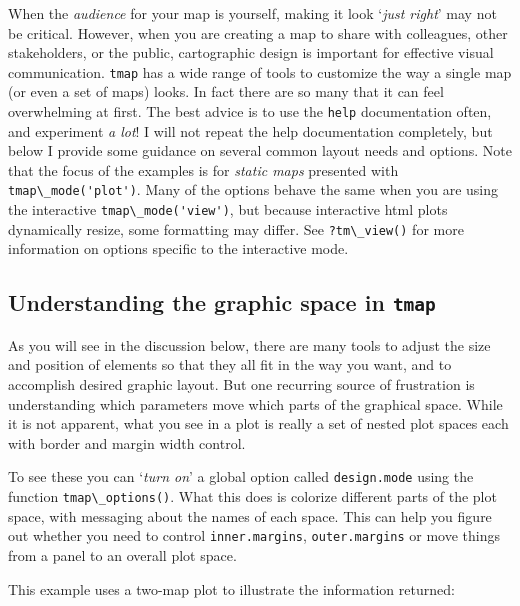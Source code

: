 \documentclass[
]{book}
\newcommand{\passthrough}[1]{#1}
\begin{document}
When the \emph{audience} for your map is yourself, making it look `\emph{just right}' may not be critical. However, when you are creating a map to share with colleagues, other stakeholders, or the public, cartographic design is important for effective visual communication. \passthrough{\lstinline!tmap!} has a wide range of tools to customize the way a single map (or even a set of maps) looks. In fact there are so many that it can feel overwhelming at first. The best advice is to use the \passthrough{\lstinline!help!} documentation often, and experiment \emph{a lot}! I will not repeat the help documentation completely, but below I provide some guidance on several common layout needs and options. Note that the focus of the examples is for \emph{static maps} presented with \passthrough{\lstinline!tmap\_mode('plot')!}. Many of the options behave the same when you are using the interactive \passthrough{\lstinline!tmap\_mode('view')!}, but because interactive html plots dynamically resize, some formatting may differ. See \passthrough{\lstinline!?tm\_view()!} for more information on options specific to the interactive mode.

\hypertarget{understanding-the-graphic-space-in-tmap}{%
\subsection{\texorpdfstring{Understanding the graphic space in \texttt{tmap}}{Understanding the graphic space in tmap}}\label{understanding-the-graphic-space-in-tmap}}

As you will see in the discussion below, there are many tools to adjust the size and position of elements so that they all fit in the way you want, and to accomplish desired graphic layout. But one recurring source of frustration is understanding which parameters move which parts of the graphical space. While it is not apparent, what you see in a plot is really a set of nested plot spaces each with border and margin width control.

To see these you can `\emph{turn on}' a global option called \passthrough{\lstinline!design.mode!} using the function \passthrough{\lstinline!tmap\_options()!}. What this does is colorize different parts of the plot space, with messaging about the names of each space. This can help you figure out whether you need to control \passthrough{\lstinline!inner.margins!}, \passthrough{\lstinline!outer.margins!} or move things from a panel to an overall plot space.

This example uses a two-map plot to illustrate the information returned:
\end{document}
